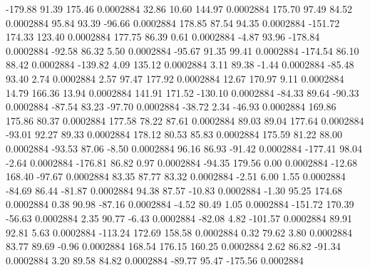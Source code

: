      -179.88       91.39      175.46     0.0002884
       32.86       10.60      144.97     0.0002884
      175.70       97.49       84.52     0.0002884
       95.84       93.39      -96.66     0.0002884
      178.85       87.54       94.35     0.0002884
     -151.72      174.33      123.40     0.0002884
      177.75       86.39        0.61     0.0002884
       -4.87       93.96     -178.84     0.0002884
      -92.58       86.32        5.50     0.0002884
      -95.67       91.35       99.41     0.0002884
     -174.54       86.10       88.42     0.0002884
     -139.82        4.09      135.12     0.0002884
        3.11       89.38       -1.44     0.0002884
      -85.48       93.40        2.74     0.0002884
        2.57       97.47      177.92     0.0002884
       12.67      170.97        9.11     0.0002884
       14.79      166.36       13.94     0.0002884
      141.91      171.52     -130.10     0.0002884
      -84.33       89.64      -90.33     0.0002884
      -87.54       83.23      -97.70     0.0002884
      -38.72        2.34      -46.93     0.0002884
      169.86      175.86       80.37     0.0002884
      177.58       78.22       87.61     0.0002884
       89.03       89.04      177.64     0.0002884
      -93.01       92.27       89.33     0.0002884
      178.12       80.53       85.83     0.0002884
      175.59       81.22       88.00     0.0002884
      -93.53       87.06       -8.50     0.0002884
       96.16       86.93      -91.42     0.0002884
     -177.41       98.04       -2.64     0.0002884
     -176.81       86.82        0.97     0.0002884
      -94.35      179.56        0.00     0.0002884
      -12.68      168.40      -97.67     0.0002884
       83.35       87.77       83.32     0.0002884
       -2.51        6.00        1.55     0.0002884
      -84.69       86.44      -81.87     0.0002884
       94.38       87.57      -10.83     0.0002884
       -1.30       95.25      174.68     0.0002884
        0.38       90.98      -87.16     0.0002884
       -4.52       80.49        1.05     0.0002884
     -151.72      170.39      -56.63     0.0002884
        2.35       90.77       -6.43     0.0002884
      -82.08        4.82     -101.57     0.0002884
       89.91       92.81        5.63     0.0002884
     -113.24      172.69      158.58     0.0002884
        0.32       79.62        3.80     0.0002884
       83.77       89.69       -0.96     0.0002884
      168.54      176.15      160.25     0.0002884
        2.62       86.82      -91.34     0.0002884
        3.20       89.58       84.82     0.0002884
      -89.77       95.47     -175.56     0.0002884
